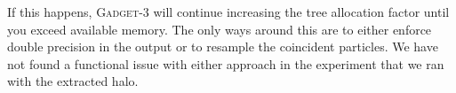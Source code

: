 If this happens, \textsc{Gadget-3} will continue increasing the tree allocation factor until you exceed available memory. The only ways around this are to either enforce double precision in the output or to resample the coincident particles. We have not found a functional issue with either approach in the experiment that we ran with the extracted halo.



